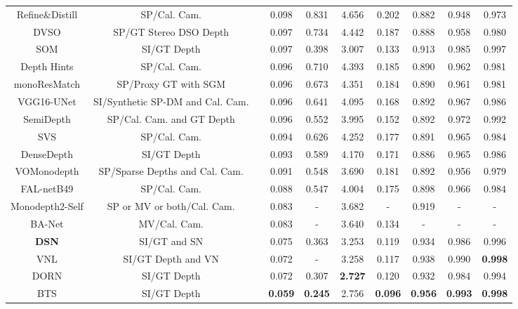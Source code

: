 \documentclass[5p]{elsarticle}
\begin{document}
\begin{table*}[]
{\begin{tabular}{c|c|c|cccc|ccc}
Refine\&Distill \cite{pilzer2019refine} & SP/Cal. Cam. &  & 0.098 & 0.831 & 4.656 & 0.202 & 0.882 & 0.948 & 0.973\\
DVSO \cite{yang2018deep} & SP/GT Stereo DSO Depth &  & 0.097 & 0.734 & 4.442 & 0.187 & 0.888 & 0.958 & 0.980\\
SOM \cite{zhu2019structure} & SI/GT Depth &  & 0.097 & 0.398 & 3.007 & 0.133 & 0.913 & 0.985 & 0.997\\
Depth Hints \cite{watson2019self} & SP/Cal. Cam. &  & 0.096 & 0.710 & 4.393 & 0.185 & 0.890 & 0.962 & 0.981\\
monoResMatch \cite{tosi2019learning} & SP/Proxy GT with SGM &  & 0.096 & 0.673 & 4.351 & 0.184 & 0.890 & 0.961 & 0.981\\
VGG16-UNet \cite{guo2018learning} & SI/Synthetic SP-DM and Cal. Cam.  &  & 0.096 & 0.641 & 4.095 & 0.168 & 0.892 & 0.967 & 0.986\\
SemiDepth \cite{amiri2019semi} & SP/Cal. Cam. and GT Depth &  & 0.096 & 0.552 & 3.995 & 0.152 & 0.892 & 0.972 & 0.992\\
SVS \cite{luo2018single} & SP/Cal. Cam. &  & 0.094 & 0.626 & 4.252 & 0.177 & 0.891 & 0.965 & 0.984\\
DenseDepth \cite{alhashim2018high} & SI/GT Depth &  & 0.093 & 0.589 & 4.170 & 0.171 & 0.886 & 0.965 & 0.986\\
VOMonodepth \cite{andraghetti2019enhancing} & SP/Sparse Depths and Cal. Cam. &  & 0.091 & 0.548 & 3.690 & 0.181 & 0.892 & 0.956 & 0.979\\
FAL-netB49 \cite{gonzalezbello2020forget} & SP/Cal. Cam. &  & 0.088 & 0.547 & 4.004 & 0.175 & 0.898 & 0.966 & 0.984\\
Monodepth2-Self \cite{poggi2020uncertainty} & SP or MV or both/Cal. Cam. &  & 0.083 & - & 3.682 & - & 0.919 & - & -\\
BA-Net \cite{tang2018ba} & MV/Cal. Cam. &  & 0.083 & - & 3.640 & 0.134 & - & - & -\\
\textbf{DSN} & SI/GT and SN &  & 0.075 & 0.363 & 3.253 & 0.119 & 0.934 & 0.986 & 0.996\\
VNL \cite{yin2019enforcing} & SI/GT Depth and VN &  & 0.072 & - & 3.258 & 0.117 & 0.938 & 0.990 & \textbf{0.998}\\
DORN \cite{fu2018deep} & SI/GT Depth &  & 0.072 & 0.307 & \textbf{2.727} & 0.120 & 0.932 & 0.984 & 0.994\\
BTS \cite{lee2019big} & SI/GT Depth &  & \textbf{0.059} & \textbf{0.245} & 2.756 & \textbf{0.096} & \textbf{0.956} & \textbf{0.993} & \textbf{0.998}\\

\end{tabular}}
\end{table*}
\end{document}
